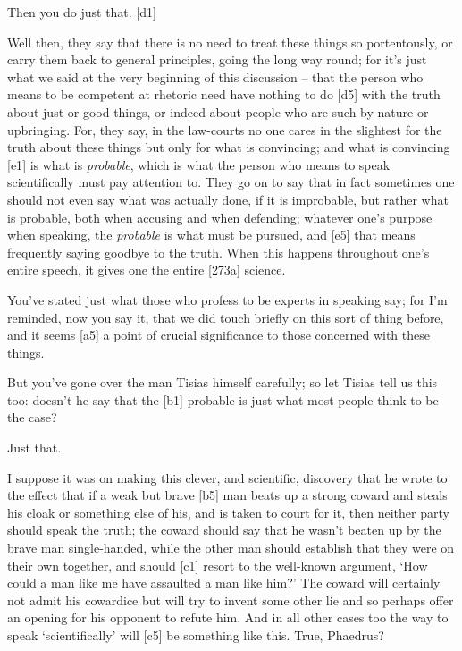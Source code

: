  Then you do just that. {[}d1{]}

 Well then, they say that there is no need to treat these things
so portentously, or carry them back to general principles, going the
long way round; for it's just what we said at the very beginning of this
discussion -- that the person who means to be competent at rhetoric need
have nothing to do {[}d5{]} with the truth about just or good things, or
indeed about people who are such by nature or upbringing. For, they say,
in the law-courts no one cares in the slightest for the truth about
these things but only for what is convincing; and what is convincing
{[}e1{]} is what is {\em probable}, which is what the person who means
to speak scientifically must pay attention to. They go on to say that in
fact sometimes one should not even say what was actually done, if it is
improbable, but rather what is probable, both when accusing and when
defending; whatever one's purpose when speaking, the {\em probable} is
what must be pursued, and {[}e5{]} that means frequently saying goodbye
to the truth. When this happens throughout one's entire speech, it gives
one the entire {[}273a{]} science.

 You've stated just what those who profess to be experts in
speaking say; for I'm reminded, now you say it, that we did touch
briefly on this sort of thing before, and it seems {[}a5{]} a point of
crucial significance to those concerned with these things.

 But you've gone over the man Tisias himself carefully; so let
Tisias tell us this too: doesn't he say that the {[}b1{]} probable is
just what most people think to be the case?

 Just that.

 I suppose it was on making this clever, and scientific,
discovery that he wrote to the effect that if a weak but brave {[}b5{]}
man beats up a strong coward and steals his cloak or something else of
his, and is taken to court for it, then neither party should speak the
truth; the coward should say that he wasn't beaten up by the brave man
single-handed, while the other man should establish that they were on
their own together, and should {[}c1{]} resort to the well-known
argument, ‘How could a man like me have assaulted a man like him?' The
coward will certainly not admit his cowardice but will try to invent
some other lie and so perhaps offer an opening for his opponent to
refute him. And in all other cases too the way to speak ‘scientifically'
will {[}c5{]} be something like this. True, Phaedrus?

